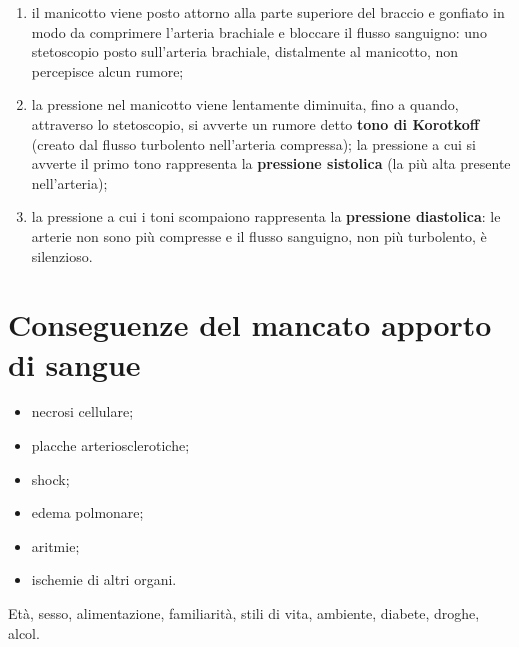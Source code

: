 \begin{enumerate}
  \item il manicotto viene posto attorno alla parte superiore del braccio e gonfiato in modo da
    comprimere l'arteria brachiale e bloccare il flusso sanguigno: uno stetoscopio posto
    sull'arteria brachiale, distalmente al manicotto, non percepisce alcun rumore;
  \item la pressione nel manicotto viene lentamente diminuita, fino a quando, attraverso lo
    stetoscopio, si avverte un rumore detto \textbf{tono di Korotkoff} (creato dal flusso
    turbolento nell'arteria compressa); la pressione a cui si avverte il primo tono rappresenta la
    \textbf{pressione sistolica} (la più alta presente nell'arteria);
  \item la pressione a cui i toni scompaiono rappresenta la \textbf{pressione diastolica}: le
    arterie non sono più compresse e il flusso sanguigno, non più turbolento, è silenzioso.
\end{enumerate}

\section{Conseguenze del mancato apporto di sangue}

\begin{itemize}
  \item necrosi cellulare;
  \item placche arteriosclerotiche;
  \item shock;
  \item edema polmonare;
  \item aritmie;
  \item ischemie di altri organi.
\end{itemize}

Età, sesso, alimentazione, familiarità, stili di vita, ambiente, diabete, droghe, alcol.
